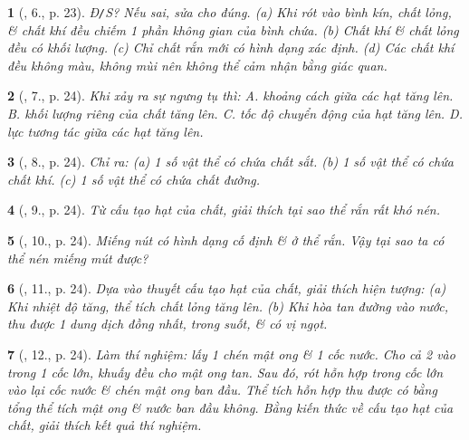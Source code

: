 \documentclass{article}
\newtheorem{baitoan}{}
\begin{document}
\begin{baitoan}[\cite{ncpt_KHTN_6_tap_1}, 6., p. 23]
	{\rm Đ{\tt/}S?} Nếu sai, sửa cho đúng. (a) Khi rót vào bình kín, chất lỏng, \& chất khí đều chiếm 1 phần không gian của bình chứa. (b) Chất khí \& chất lỏng đều có khối lượng. (c) Chỉ chất rắn mới có hình dạng xác định. (d) Các chất khí đều không màu, không mùi nên không thể cảm nhận bằng giác quan.
\end{baitoan}

\begin{baitoan}[\cite{ncpt_KHTN_6_tap_1}, 7., p. 24]
	Khi xảy ra sự ngưng tụ thì: {\sf A.} khoảng cách giữa các hạt tăng lên. {\sf B.} khối lượng riêng của chất tăng lên. {\sf C.} tốc độ chuyển động của hạt tăng lên. {\sf D.} lực tương tác giữa các hạt tăng lên.
\end{baitoan}

\begin{baitoan}[\cite{ncpt_KHTN_6_tap_1}, 8., p. 24]
	Chỉ ra: (a) 1 số vật thể có chứa chất sắt. (b) 1 số vật thể có chứa chất khí. (c) 1 số vật thể có chứa chất đường.
\end{baitoan}

\begin{baitoan}[\cite{ncpt_KHTN_6_tap_1}, 9., p. 24]
	Từ cấu tạo hạt của chất, giải thích tại sao thể rắn rất khó nén.
\end{baitoan}

\begin{baitoan}[\cite{ncpt_KHTN_6_tap_1}, 10., p. 24]
	Miếng nút có hình dạng cố định \& ở thể rắn. Vậy tại sao ta có thể nén miếng mút được?
\end{baitoan}

\begin{baitoan}[\cite{ncpt_KHTN_6_tap_1}, 11., p. 24]
	Dựa vào thuyết cấu tạo hạt của chất, giải thích hiện tượng: (a) Khi nhiệt độ tăng, thể tích chất lỏng tăng lên. (b) Khi hòa tan đường vào nước, thu được 1 dung dịch đồng nhất, trong suốt, \& có vị ngọt.
\end{baitoan}

\begin{baitoan}[\cite{ncpt_KHTN_6_tap_1}, 12., p. 24]
	Làm thí nghiệm: lấy 1 chén mật ong \& 1 cốc nước. Cho cả 2 vào trong 1 cốc lớn, khuấy đều cho mật ong tan. Sau đó, rót hỗn hợp trong cốc lớn vào lại cốc nước \& chén mật ong ban đầu. Thể tích hỗn hợp thu được có bằng tổng thể tích mật ong \& nước ban đầu không. Bằng kiến thức về cấu tạo hạt của chất, giải thích kết quả thí nghiệm.
\end{baitoan}
\end{document}
